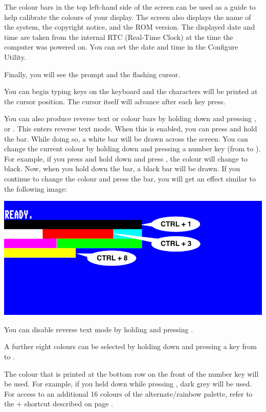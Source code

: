 The colour bars in the top left-hand side of the screen can be used as a guide to help calibrate the colours of your display. The screen also displays the name of the system, the copyright notice, and the ROM version. The displayed date and time are taken from the internal RTC (Real-Time Clock) at the time the computer was powered on. You can set the date and time in the Configure Utility.

Finally, you will see the  prompt and the flashing cursor.

You can begin typing keys on the keyboard and the characters will be printed at the cursor position. The cursor itself will advance after each key press.

You can also produce reverse text or colour bars by holding down  and pressing , or . This enters reverse text mode. When this is enabled, you can press and hold the  bar. While doing so, a white bar will be drawn across the screen.
You can change the current colour by holding  down and pressing a number key (from 
to ). For example, if you press and hold  down and press , the colour will
change to black. Now, when you hold down the  bar, a black bar will be drawn. If you continue to
change the colour and press the  bar, you will get an effect similar to the following image:

\begin{center}
\includegraphics[width=0.7\linewidth]{images/introduction-screen/colour-bars.png}
\end{center}

You can disable reverse text mode by holding  and pressing .

A further eight colours can be selected by holding down \megasymbolkey and pressing a key from  to .

The colour that is printed at the bottom row on the front of the number key will be used. For example, if you held
\megasymbolkey down while pressing , dark grey will be used. For access to an additional 16 colours of the alternate/rainbow palette, refer to the  +  shortcut described on page \pageref{appendix:controlcodes}.

